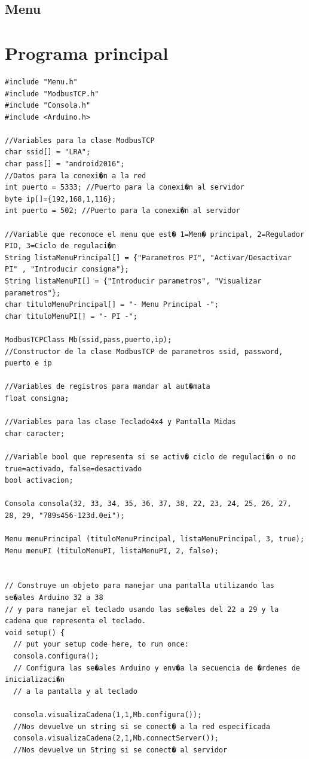 \documentclass[11pt,twoside]{book}
\begin{document}
\subsection{Menu}

\section{Programa principal}

\begin{lstlisting}
#include "Menu.h"
#include "ModbusTCP.h"
#include "Consola.h"
#include <Arduino.h>

//Variables para la clase ModbusTCP
char ssid[] = "LRA";
char pass[] = "android2016";
//Datos para la conexi�n a la red
int puerto = 5333; //Puerto para la conexi�n al servidor
byte ip[]={192,168,1,116};
int puerto = 502; //Puerto para la conexi�n al servidor

//Variable que reconoce el menu que est� 1=Men� principal, 2=Regulador PID, 3=Ciclo de regulaci�n
String listaMenuPrincipal[] = {"Parametros PI", "Activar/Desactivar PI" , "Introducir consigna"};
String listaMenuPI[] = {"Introducir parametros", "Visualizar parametros"};
char tituloMenuPrincipal[] = "- Menu Principal -";
char tituloMenuPI[] = "- PI -";

ModbusTCPClass Mb(ssid,pass,puerto,ip);
//Constructor de la clase ModbusTCP de parametros ssid, password, puerto e ip

//Variables de registros para mandar al aut�mata
float consigna;

//Variables para las clase Teclado4x4 y Pantalla Midas
char caracter;

//Variable bool que representa si se activ� ciclo de regulaci�n o no true=activado, false=desactivado
bool activacion;

Consola consola(32, 33, 34, 35, 36, 37, 38, 22, 23, 24, 25, 26, 27, 28, 29, "789s456-123d.0ei");

Menu menuPrincipal (tituloMenuPrincipal, listaMenuPrincipal, 3, true);
Menu menuPI (tituloMenuPI, listaMenuPI, 2, false);


// Construye un objeto para manejar una pantalla utilizando las se�ales Arduino 32 a 38
// y para manejar el teclado usando las se�ales del 22 a 29 y la cadena que representa el teclado.
void setup() {
  // put your setup code here, to run once:
  consola.configura();
  // Configura las se�ales Arduino y env�a la secuencia de �rdenes de inicializaci�n
  // a la pantalla y al teclado

  consola.visualizaCadena(1,1,Mb.configura());
  //Nos devuelve un string si se conect� a la red especificada
  consola.visualizaCadena(2,1,Mb.connectServer());
  //Nos devuelve un String si se conect� al servidor


\end{lstlisting}
\end{document}
